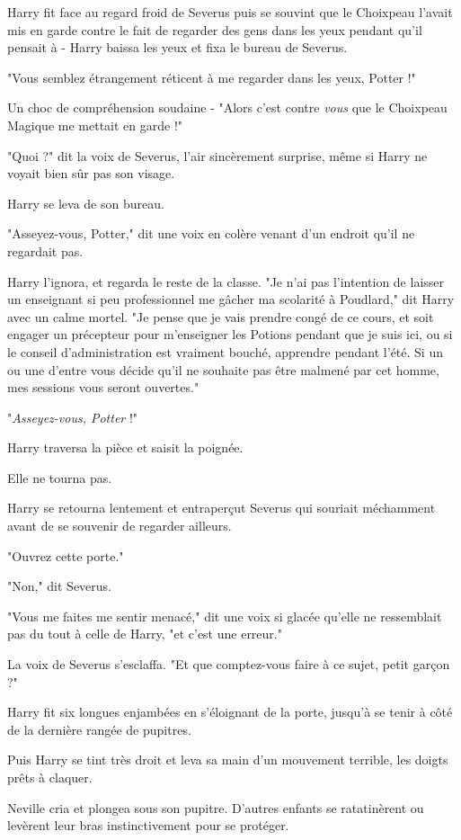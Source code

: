 Harry fit face au regard froid de Severus puis se souvint que le Choixpeau l'avait mis en garde contre le fait de regarder des gens dans les yeux pendant qu'il pensait à - Harry baissa les yeux et fixa le bureau de Severus.

"Vous semblez étrangement réticent à me regarder dans les yeux, Potter !"

Un choc de compréhension soudaine - "Alors c'est contre \emph{vous}  que le Choixpeau Magique me mettait en garde !"

"Quoi ?" dit la voix de Severus, l'air sincèrement surprise, même si Harry ne voyait bien sûr pas son visage.

Harry se leva de son bureau.

"Asseyez-vous, Potter," dit une voix en colère venant d'un endroit qu'il ne regardait pas.

Harry l'ignora, et regarda le reste de la classe. "Je n'ai pas l'intention de laisser un enseignant si peu professionnel me gâcher ma scolarité à Poudlard," dit Harry avec un calme mortel. "Je pense que je vais prendre congé de ce cours, et soit engager un précepteur pour m'enseigner les Potions pendant que je suis ici, ou si le conseil d'administration est vraiment bouché, apprendre pendant l'été. Si un ou une d'entre vous décide qu'il ne souhaite pas être malmené par cet homme, mes sessions vous seront ouvertes."

"\emph{Asseyez-vous, Potter}  !"

Harry traversa la pièce et saisit la poignée.

Elle ne tourna pas.

Harry se retourna lentement et entraperçut Severus qui souriait méchamment avant de se souvenir de regarder ailleurs.

"Ouvrez cette porte."

"Non," dit Severus.

"Vous me faites me sentir menacé," dit une voix si glacée qu'elle ne ressemblait pas du tout à celle de Harry, "et c'est une erreur."

La voix de Severus s'esclaffa. "Et que comptez-vous faire à ce sujet, petit garçon ?"

Harry fit six longues enjambées en s'éloignant de la porte, jusqu'à se tenir à côté de la dernière rangée de pupitres.

Puis Harry se tint très droit et leva sa main d'un mouvement terrible, les doigts prêts à claquer.

Neville cria et plongea sous son pupitre. D'autres enfants se ratatinèrent ou levèrent leur bras instinctivement pour se protéger.

